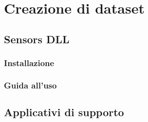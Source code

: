 \section{Creazione di dataset}\label{sec:create-dataset-howto}
\omissis{}

\subsection{Sensors DLL}
\omissis{}

\subsubsection{Installazione}
\omissis{}

\subsubsection{Guida all'uso}
\omissis{}

\subsection{Applicativi di supporto}
\omissis{}
